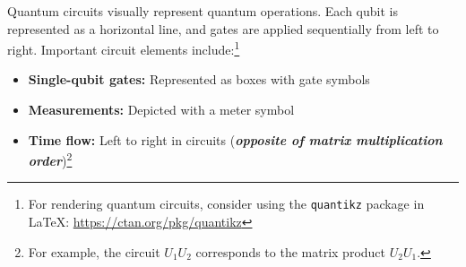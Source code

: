 Quantum circuits visually represent quantum operations. Each qubit is
represented as a horizontal line, and gates are applied sequentially from
left to right. Important circuit elements include:\footnote{For rendering
quantum circuits, consider using the \texttt{quantikz} package in \LaTeX:
\url{https://ctan.org/pkg/quantikz}}

\begin{itemize}

  \item \textbf{Single-qubit gates:} Represented as boxes with gate symbols

  \item \textbf{Measurements:} Depicted with a meter symbol

  \item \textbf{Time flow:} Left to right in circuits (\textit{\textbf{opposite
    of matrix multiplication order}})\footnote {
      For example, the circuit $U_1U_2$ corresponds to the
      matrix product $U_2U_1$.
  }

\end{itemize}


